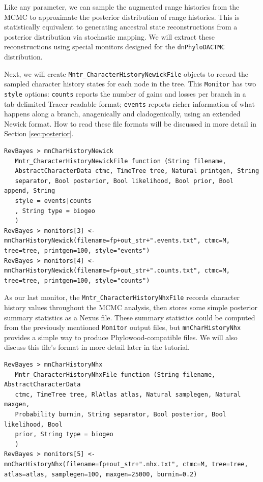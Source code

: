 \documentclass[11pt]{article}
\begin{document}
Like any parameter, we can sample the augmented range histories from the MCMC to approximate the posterior distribution of range histories.
This is statistically equivalent to generating ancestral state reconstructions from a posterior distribution via stochastic mapping.
We will extract these reconstructions using special monitors designed for the {\tt dnPhyloDACTMC} distribution.

Next, we will create {\tt Mntr\_CharacterHistoryNewickFile} objects to record the sampled character history states for each node in the tree.
This {\tt Monitor} has two {\tt style} options: {\tt counts} reports the number of gains and losses per branch in a tab-delimited Tracer-readable format;  {\tt events} reports richer information of what happens along a branch, anagenically and cladogenically, using an extended Newick format.
How to read these file formats will be discussed in more detail in Section \ref{sec:posterior}.

\begin{snugshade}
\begin{lstlisting}
RevBayes > mnCharHistoryNewick
   Mntr_CharacterHistoryNewickFile function (String filename,
   AbstractCharacterData ctmc, TimeTree tree, Natural printgen, String
   separator, Bool posterior, Bool likelihood, Bool prior, Bool append, String
   style = events|counts
   , String type = biogeo
   )
RevBayes > monitors[3] <- mnCharHistoryNewick(filename=fp+out_str+".events.txt", ctmc=M, tree=tree, printgen=100, style="events")
RevBayes > monitors[4] <- mnCharHistoryNewick(filename=fp+out_str+".counts.txt", ctmc=M, tree=tree, printgen=100, style="counts")
\end{lstlisting}
\end{snugshade}

As our last monitor, the {\tt Mntr\_CharacterHistoryNhxFile} records character history values throughout the MCMC analysis, then stores some simple posterior summary statistics as a Nexus file.
These summary statistics could be computed from the previously mentioned {\tt Monitor} output files, but {\tt mnCharHistoryNhx} provides a simple way to produce Phylowood-compatible files.
We will also discuss this file's format in more detail later in the tutorial.

\begin{snugshade}
\begin{lstlisting}
RevBayes > mnCharHistoryNhx
   Mntr_CharacterHistoryNhxFile function (String filename, AbstractCharacterData
   ctmc, TimeTree tree, RlAtlas atlas, Natural samplegen, Natural maxgen,
   Probability burnin, String separator, Bool posterior, Bool likelihood, Bool
   prior, String type = biogeo
   )
RevBayes > monitors[5] <- mnCharHistoryNhx(filename=fp+out_str+".nhx.txt", ctmc=M, tree=tree, atlas=atlas, samplegen=100, maxgen=25000, burnin=0.2)
\end{lstlisting}
\end{snugshade}
\end{document}
